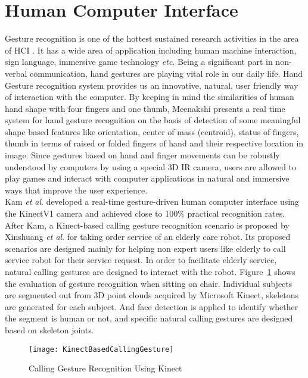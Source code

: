 \section{Human Computer Interface}
\indent
Gesture recognition is one of the hottest sustained research activities in the area of HCI \cite{NIRGesture14}. It has a wide area of application including human machine interaction, sign language, immersive game technology \textit{etc}. Being a significant part in non-verbal communication, hand gestures are playing vital role in our daily life. Hand Gesture recognition system provides us an innovative, natural, user friendly way of interaction with the computer. By keeping in mind the similarities of human hand shape with four fingers and one thumb, Meenakshi \cite{gestureRecognition12} presents a real time system for hand gesture recognition on the basis of detection of some meaningful shape based features like orientation, center of mass (centroid), status of fingers, thumb in terms of raised or folded fingers of hand and their respective location in image. Since gestures based on hand and finger movements can be robustly understood by computers by using a special 3D IR camera, users are allowed to play games and interact with computer applications in natural and immersive ways that improve the user experience. 
\\\indent
Kam \textit{et al}. \cite{KinectGesture12} developed a real-time gesture-driven human computer interface using the KinectV1 camera and achieved close to 100\% practical recognition rates. After Kam, a Kinect-based calling gesture recognition scenario is proposed by Xinshuang  \textit{et al}. \cite{gestureKinect14} for taking order service of an elderly care robot. Its proposed scenarios are designed mainly for helping non expert users like elderly to call service robot for their service request. In order to facilitate elderly service, natural calling gestures are designed to interact with the robot. Figure~\ref{KinectBasedCallingGesture} shows the evaluation of gesture recognition when sitting on chair. Individual subjects are segmented out from 3D point clouds acquired by Microsoft Kinect, skeletons are generated for each subject. And face detection is applied to identify whether the segment is human or not, and specific natural calling gestures are designed based on skeleton joints. %
\\\indent
\begin{figure}[t]
\centering
\texttt{[image: KinectBasedCallingGesture]}
\caption{Calling Gesture Recognition Using Kinect \cite{gestureKinect14}}
\label{KinectBasedCallingGesture}
\end{figure}%
